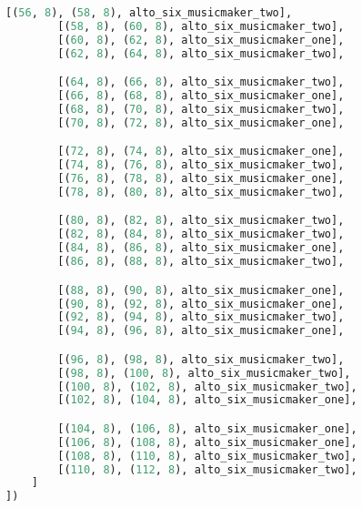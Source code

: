 \begin{lstlisting}[language=Python, caption=Invocation Source Code]
        [(56, 8), (58, 8), alto_six_musicmaker_two],
        [(58, 8), (60, 8), alto_six_musicmaker_two],
        [(60, 8), (62, 8), alto_six_musicmaker_one],
        [(62, 8), (64, 8), alto_six_musicmaker_two],

        [(64, 8), (66, 8), alto_six_musicmaker_two],
        [(66, 8), (68, 8), alto_six_musicmaker_one],
        [(68, 8), (70, 8), alto_six_musicmaker_two],
        [(70, 8), (72, 8), alto_six_musicmaker_one],

        [(72, 8), (74, 8), alto_six_musicmaker_one],
        [(74, 8), (76, 8), alto_six_musicmaker_two],
        [(76, 8), (78, 8), alto_six_musicmaker_one],
        [(78, 8), (80, 8), alto_six_musicmaker_two],

        [(80, 8), (82, 8), alto_six_musicmaker_two],
        [(82, 8), (84, 8), alto_six_musicmaker_two],
        [(84, 8), (86, 8), alto_six_musicmaker_one],
        [(86, 8), (88, 8), alto_six_musicmaker_two],

        [(88, 8), (90, 8), alto_six_musicmaker_one],
        [(90, 8), (92, 8), alto_six_musicmaker_one],
        [(92, 8), (94, 8), alto_six_musicmaker_two],
        [(94, 8), (96, 8), alto_six_musicmaker_one],

        [(96, 8), (98, 8), alto_six_musicmaker_two],
        [(98, 8), (100, 8), alto_six_musicmaker_two],
        [(100, 8), (102, 8), alto_six_musicmaker_two],
        [(102, 8), (104, 8), alto_six_musicmaker_one],

        [(104, 8), (106, 8), alto_six_musicmaker_one],
        [(106, 8), (108, 8), alto_six_musicmaker_one],
        [(108, 8), (110, 8), alto_six_musicmaker_two],
        [(110, 8), (112, 8), alto_six_musicmaker_two],
    ]
])


\end{lstlisting}
